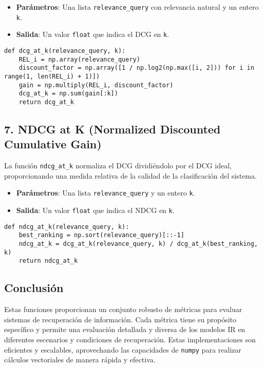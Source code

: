 \documentclass[11pt,english]{article}
\theoremstyle{plain}
\begin{document}
\begin{itemize}
    \item \textbf{Parámetros}: Una lista \texttt{relevance\_query} con relevancia natural y un entero \texttt{k}.
    \item \textbf{Salida}: Un valor \texttt{float} que indica el DCG en \texttt{k}.
\end{itemize}

\begin{verbatim}
def dcg_at_k(relevance_query, k):
    REL_i = np.array(relevance_query)
    discount_factor = np.array([1 / np.log2(np.max([i, 2])) for i in range(1, len(REL_i) + 1)])
    gain = np.multiply(REL_i, discount_factor)
    dcg_at_k = np.sum(gain[:k])
    return dcg_at_k
\end{verbatim}

\subsection*{7. NDCG at K (Normalized Discounted Cumulative Gain)}

La función \texttt{ndcg\_at\_k} normaliza el DCG dividiéndolo por el DCG ideal, proporcionando una medida relativa de la calidad de la clasificación del sistema.

\begin{itemize}
    \item \textbf{Parámetros}: Una lista \texttt{relevance\_query} y un entero \texttt{k}.
    \item \textbf{Salida}: Un valor \texttt{float} que indica el NDCG en \texttt{k}.
\end{itemize}

\begin{verbatim}
def ndcg_at_k(relevance_query, k):
    best_ranking = np.sort(relevance_query)[::-1]
    ndcg_at_k = dcg_at_k(relevance_query, k) / dcg_at_k(best_ranking, k)
    return ndcg_at_k
\end{verbatim}

\subsection*{Conclusión}

Estas funciones proporcionan un conjunto robusto de métricas para evaluar sistemas de recuperación de información. Cada métrica tiene su propósito específico y permite una evaluación detallada y diversa de los modelos IR en diferentes escenarios y condiciones de recuperación. Estas implementaciones son eficientes y escalables, aprovechando las capacidades de \texttt{numpy} para realizar cálculos vectoriales de manera rápida y efectiva.
\end{document}
